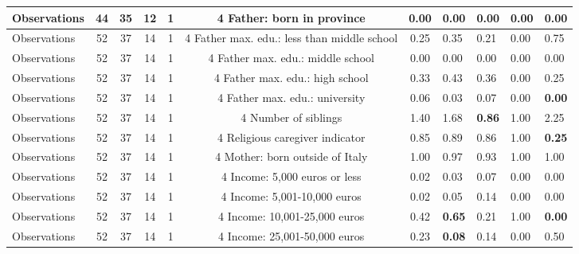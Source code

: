 \begin{tabular}{l c c c c c c }
\midrule
Observations &        44 &        35 &        12 &         1 &         4
Father: born in province &      0.00 &      0.00 &      0.00 &      0.00 &      0.00 \\
\midrule
Observations &        52 &        37 &        14 &         1 &         4
Father max. edu.: less than middle school &      0.25 &      0.35 &      0.21 &      0.00 &      0.75 \\
\midrule
Observations &        52 &        37 &        14 &         1 &         4
Father max. edu.: middle school &      0.00 &      0.00 &      0.00 &      0.00 &      0.00 \\
\midrule
Observations &        52 &        37 &        14 &         1 &         4
Father max. edu.: high school &      0.33 &      0.43 &      0.36 &      0.00 &      0.25 \\
\midrule
Observations &        52 &        37 &        14 &         1 &         4
Father max. edu.: university &      0.06 &      0.03 &      0.07 &      0.00 & \textbf{     0.00} \\
\midrule
Observations &        52 &        37 &        14 &         1 &         4
Number of siblings &      1.40 &      1.68 & \textbf{     0.86} &      1.00 &      2.25 \\
\midrule
Observations &        52 &        37 &        14 &         1 &         4
Religious caregiver indicator &      0.85 &      0.89 &      0.86 &      1.00 & \textbf{     0.25} \\
\midrule
Observations &        52 &        37 &        14 &         1 &         4
Mother: born outside of Italy &      1.00 &      0.97 &      0.93 &      1.00 &      1.00 \\
\midrule
Observations &        52 &        37 &        14 &         1 &         4
Income: 5,000 euros or less &      0.02 &      0.03 &      0.07 &      0.00 &      0.00 \\
\midrule
Observations &        52 &        37 &        14 &         1 &         4
Income: 5,001-10,000 euros &      0.02 &      0.05 &      0.14 &      0.00 &      0.00 \\
\midrule
Observations &        52 &        37 &        14 &         1 &         4
Income: 10,001-25,000 euros &      0.42 & \textbf{     0.65} &      0.21 &      1.00 & \textbf{     0.00} \\
\midrule
Observations &        52 &        37 &        14 &         1 &         4
Income: 25,001-50,000 euros &      0.23 & \textbf{     0.08} &      0.14 &      0.00 &      0.50 \\

\end{tabular}
